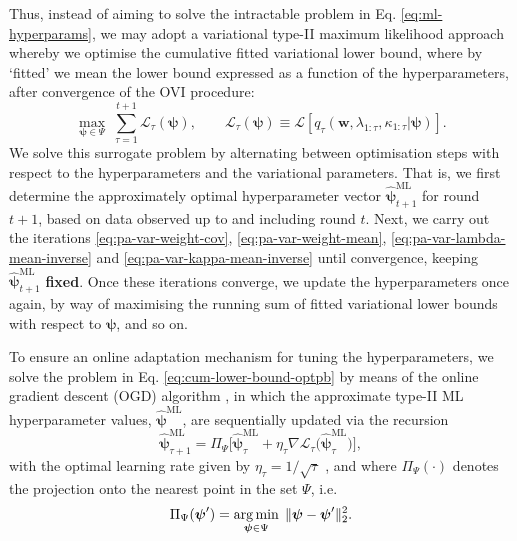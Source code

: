 Thus, instead of aiming to solve the intractable problem in Eq. \eqref{eq:ml-hyperparams}, we may adopt a variational type-II maximum likelihood approach whereby we optimise the cumulative fitted variational lower bound, where by `fitted' we mean the lower bound expressed as a function of the hyperparameters, after convergence of the OVI procedure:
\begin{equation}
\label{eq:cum-lower-bound-optpb}
	\max_{\boldsymbol{\psi}\in\Psi} \; \sum_{\tau=1}^{t+1} \mathcal{L}_{\tau}(\boldsymbol{\psi}),
	\qquad
	\mathcal{L}_{\tau}(\boldsymbol{\psi})
	\equiv \mathcal{L}[q_{\tau}(\mathbf{w}, \lambda_{1:\tau}, \kappa_{1:\tau}|\boldsymbol{\psi})].
\end{equation}
We solve this surrogate problem by alternating between optimisation steps with respect to the hyperparameters and the variational parameters. That is, we first determine the approximately optimal hyperparameter vector $\widehat{\boldsymbol{\psi}}_{t+1}^\text{ML}$ for round $t+1$, based on data observed up to and including round $t$. Next, we carry out the iterations \eqref{eq:pa-var-weight-cov}, \eqref{eq:pa-var-weight-mean}, \eqref{eq:pa-var-lambda-mean-inverse} and \eqref{eq:pa-var-kappa-mean-inverse} until convergence, keeping $\widehat{\boldsymbol{\psi}}_{t+1}^\text{ML}$ \textbf{fixed}. Once these iterations converge, we update the hyperparameters once again, by way of maximising the running sum of fitted variational lower bounds with respect to $\boldsymbol{\psi}$, and so on.

To ensure an online adaptation mechanism for tuning the hyperparameters, we solve the problem in Eq. \eqref{eq:cum-lower-bound-optpb} by means of the online gradient descent (OGD) algorithm \citep{zinkevich03}, in which the approximate type-II ML hyperparameter values, $\widehat{\boldsymbol{\psi}}^\text{ML}$, are sequentially updated via the recursion
\begin{equation}
	\widehat{\boldsymbol{\psi}}_{\tau+1}^\text{ML}
	= \Pi_{\Psi}\big[\widehat{\boldsymbol{\psi}}_{\tau}^\text{ML} + \eta_\tau\nabla\mathcal{L}_{\tau}\big(\widehat{\boldsymbol{\psi}}_{\tau}^\text{ML}\big)\big],
\end{equation}
with the optimal learning rate given by $\eta_\tau = 1/\sqrt{\tau}$ \citep[Theorem~1]{zinkevich03}, and where $\Pi_{\Psi}(\cdot)$ denotes the projection onto the nearest point in  the set $\Psi$, i.e.\
\begin{equation}
	\Pi_{\Psi}(\boldsymbol{\psi}^\prime)
	= \operatorname*{arg\,min}_{\boldsymbol{\psi}\in\Psi}\;
	\Vert\boldsymbol{\psi}-\boldsymbol{\psi}^\prime\Vert_2^2.
\end{equation}

